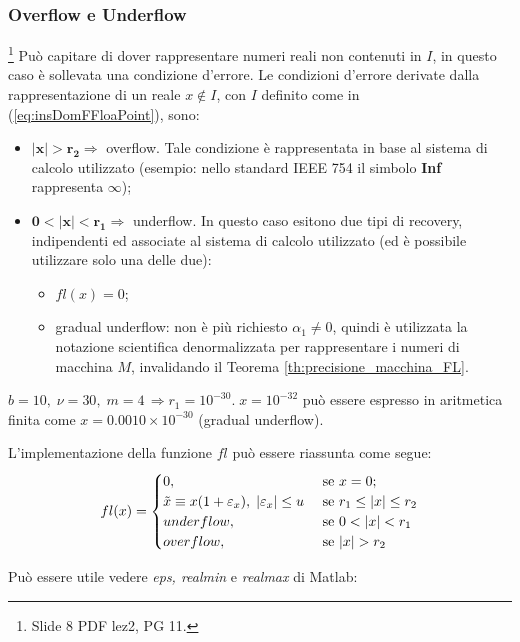 \subsubsection{Overflow e Underflow}\footnote{Slide 8 PDF lez2, PG 11.}
Può capitare di dover rappresentare numeri reali non contenuti in $I$, in questo caso è sollevata una condizione d'errore. Le condizioni d'errore derivate dalla rappresentazione di un reale $x\notin I$, con $I$ definito come in (\ref{eq:insDomFFloaPoint}), sono:
\begin{itemize}
	\item $\boldsymbol{|x|>r_2}\Rightarrow$ overflow. Tale condizione è rappresentata in base al sistema di calcolo utilizzato (esempio: nello standard IEEE 754 il simbolo \textbf{Inf} rappresenta $\infty$);
	\item $\boldsymbol{0<|x|<r_1}\Rightarrow$ underflow. In questo caso esitono due tipi di recovery, indipendenti ed associate al sistema di calcolo utilizzato (ed è possibile utilizzare solo una delle due):
	\begin{itemize}
		\item $fl(x)=0$;
		\item gradual underflow: non è più richiesto $\alpha_1\neq 0$, quindi è utilizzata la notazione scientifica denormalizzata per rappresentare i numeri di macchina $M$, invalidando il Teorema \ref{th:precisione_macchina_FL}. 
	\end{itemize}
\end{itemize}

\begin{example}
	$b=10,\; \nu=30,\; m=4\, \Rightarrow r_1=10^{-30}.\; x=10^{-32}$ può essere espresso in aritmetica finita come $x=0.0010\times 10^{-30}$ (gradual underflow).
\end{example}

L'implementazione della funzione $fl$ può essere riassunta come segue:
\begin{align*}
	fl(x)=\begin{cases}
		0, &\text{ se } x=0;\\
		\Tilde{x}\equiv x(1+\varepsilon_x),\; |\varepsilon_x|\leq u &\text{ se } r_1\leq|x|\leq r_2\\
		underflow, &\text{ se } 0<|x|<r_1\\
		overflow, &\text{ se } |x|>r_2
	\end{cases}
\end{align*}

\begin{remark}\label{rem:epsRMaxRmin}
	Può essere utile vedere \textit{eps, realmin} e \textit{realmax} di Matlab:
\end{remark}

